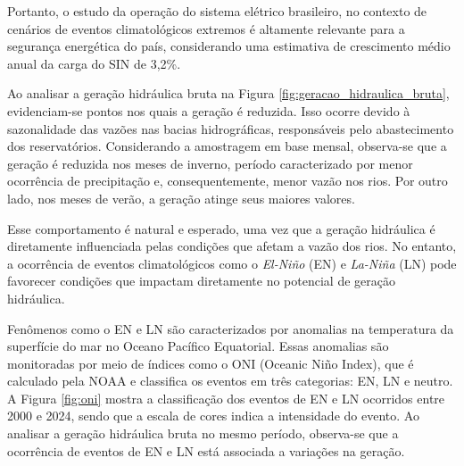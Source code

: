Portanto, o estudo da operação do sistema elétrico brasileiro, no contexto de cenários de eventos
climatológicos extremos é altamente relevante para a segurança energética do país, considerando uma estimativa de 
crescimento médio anual da carga do SIN de 3,2\%. \cite{pen2024}

Ao analisar a geração hidráulica bruta na Figura \ref{fig:geracao_hidraulica_bruta}, evidenciam-se pontos nos 
quais a geração é reduzida. Isso ocorre devido à sazonalidade das vazões nas bacias hidrográficas, responsáveis pelo 
abastecimento dos reservatórios. Considerando a amostragem em base mensal, observa-se que a geração é reduzida nos meses
de inverno, período caracterizado por menor ocorrência de precipitação e, consequentemente, menor vazão nos rios. Por
outro lado, nos meses de verão, a geração atinge seus maiores valores.

\begin{figure}[!ht]
	{}
	{}
\end{figure}

Esse comportamento é natural e esperado, uma vez que a geração hidráulica é diretamente influenciada pelas condições
que afetam a vazão dos rios. No entanto, a ocorrência de eventos climatológicos como o \textit{El-Niño} (EN) e 
\textit{La-Niña} (LN) pode favorecer condições que impactam diretamente no potencial de geração hidráulica. \cite{de2012influencia}

Fenômenos como o EN e LN são caracterizados por anomalias na temperatura da superfície do mar no Oceano Pacífico
Equatorial. Essas anomalias são monitoradas por meio de índices como o ONI (Oceanic Niño Index), que é calculado
pela NOAA e classifica os eventos em três categorias: EN, LN e neutro. A Figura \ref{fig:oni} mostra a classificação
dos eventos de EN e LN ocorridos entre 2000 e 2024, sendo que a escala de cores indica a intensidade do evento. Ao
analisar a geração hidráulica bruta no mesmo período, observa-se que a ocorrência de eventos de EN e LN está associada
a variações na geração.

\begin{figure}[!ht]
	{}
	{}
\end{figure}

